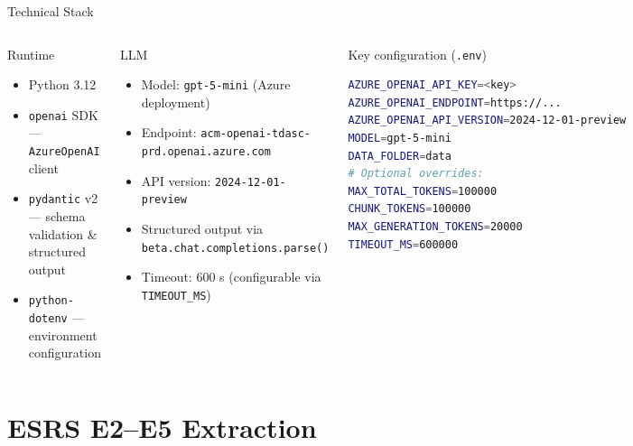 \documentclass[aspectratio=169]{beamer}
\begin{document}
\begin{frame}[fragile,shrink=10]{Technical Stack}
  \begin{columns}
      \begin{block}{Runtime}
        \begin{itemize}
          \item Python 3.12
          \item \texttt{openai} SDK --- \texttt{AzureOpenAI} client
          \item \texttt{pydantic} v2 --- schema validation \& structured output
          \item \texttt{python-dotenv} --- environment configuration
        \end{itemize}
      \end{block}
      \vspace{6pt}
      \begin{block}{LLM}
        \begin{itemize}
          \item Model: \texttt{gpt-5-mini} (Azure deployment)
          \item Endpoint: \texttt{acm-openai-tdasc-prd.openai.azure.com}
          \item API version: \texttt{2024-12-01-preview}
          \item Structured output via \texttt{beta.chat.completions.parse()}
          \item Timeout: 600 s (configurable via \texttt{TIMEOUT\_MS})
        \end{itemize}
      \end{block}
      \begin{block}{Key configuration (\texttt{.env})}
        \begin{lstlisting}[language=bash]
AZURE_OPENAI_API_KEY=<key>
AZURE_OPENAI_ENDPOINT=https://...
AZURE_OPENAI_API_VERSION=2024-12-01-preview
MODEL=gpt-5-mini
DATA_FOLDER=data
# Optional overrides:
MAX_TOTAL_TOKENS=100000
CHUNK_TOKENS=100000
MAX_GENERATION_TOKENS=20000
TIMEOUT_MS=600000
        \end{lstlisting}
      \end{block}
  \end{columns}
\end{frame}

\section{ESRS E2--E5 Extraction}
\end{document}
